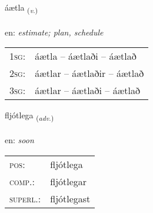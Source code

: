 \documentclass[frontgrid, backgrid]{flacards}\usepackage[]{graphicx}\usepackage[]{color}
\begin{document}
\renewcommand{\flhead}{\vskip5pt \fboxsep=0pt {\small\bfseries\footnotesize Sagnorð | Verb}}
\renewcommand{\fcfoot}{\vskip5pt \fboxsep=0pt \hspace{2pt}{\small\bfseries\footnotesize 2K}}

\renewcommand{\blhead}{\vskip5pt {\small\bfseries\footnotesize Sagnorð | Verb }}
\renewcommand{\bcfoot}{\vskip5pt \hspace{2pt}{\small\bfseries\footnotesize 2K}}


{áætla \small{\textsubscript{(\textit{v.})}} \\[1ex] %
\textphonetic{[auːaihtla]} \\
en: \emph{estimate; plan, schedule} \\  [2ex]
\renewcommand*{\arraystretch}{0.8}
\begin{tabular}{p{1cm}l}
\textsc{1sg}: & áætla -- áætlaði -- áætlað \\ 
\textsc{2sg}: & áætlar -- áætlaðir -- áætlað \\ 
\textsc{3sg}: & áætlar -- áætlaði -- áætlað \\ 
\end{tabular}
}

\renewcommand{\flhead}{\vskip5pt \fboxsep=0pt {\small\bfseries\footnotesize Atviksorð | Adverb}}
\renewcommand{\fcfoot}{\vskip5pt \fboxsep=0pt \hspace{2pt}{\small\bfseries\footnotesize 2K}}

\renewcommand{\blhead}{\vskip5pt {\small\bfseries\footnotesize Atviksorð | Adverb }}
\renewcommand{\bcfoot}{\vskip5pt \hspace{2pt}{\small\bfseries\footnotesize 2K}}


{fljótlega \small{\textsubscript{(\textit{adv.})}} \\[1ex] %
\textphonetic{[fljoutlɛɣa]} \\
en: \emph{soon} \\  [2ex]
\renewcommand*{\arraystretch}{0.8}
\begin{tabular}{ll}
\textsc{pos}: & fljótlega \\ 
\textsc{comp.}: & fljótlegar \\ 
\textsc{superl.}: & fljótlegast \\
\end{tabular}
}
\end{document}
